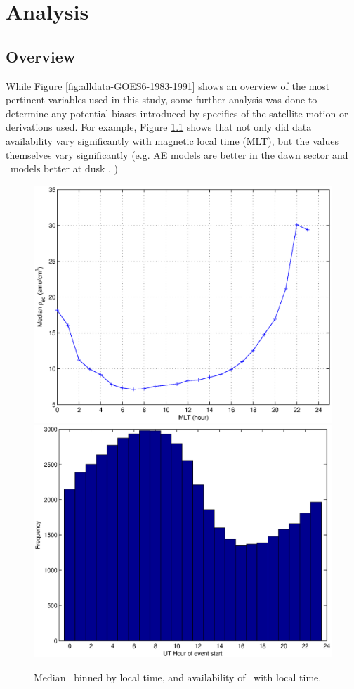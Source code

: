 \chapter[Analysis]{Analysis}

\section{Overview}
While Figure \ref{fig:alldata-GOES6-1983-1991} shows an overview of the most pertinent variables used in this study, some further analysis was done to determine any potential biases introduced by specifics of the satellite motion or derivations used. For example, Figure \ref{fig:ByHourExample} shows that not only did data availability vary significantly with magnetic local time (MLT), but the values themselves vary significantly (e.g. AE models are better in the dawn sector and \dst\ models better at dusk \citep{OBrien2003EmpiricalPlasmapause}. )

\begin{figure}[htp!]
\centering
\includegraphics[width=0.7\linewidth]{Figures/rhoMLT.eps}
\includegraphics[width=0.7\linewidth]{Figures/nansbyhour.eps}
\caption{Median \req\ binned by local time, and availability of \req\ with local time.}
\label{fig:ByHourExample}
\end{figure}


